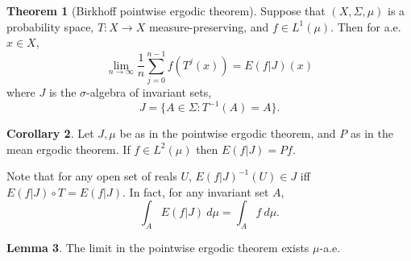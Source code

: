 \documentclass[12pt]{report}
\theoremstyle{definition}
\newtheorem{theorem}{Theorem}[chapter]
\newtheorem{lemma}[theorem]{Lemma}
\newtheorem{corollary}[theorem]{Corollary}
\begin{document}
\begin{theorem}[Birkhoff pointwise ergodic theorem]
Suppose that $(X, \Sigma, \mu)$ is a probability space, $T: X \to X$ measure-preserving, and $f \in L^1(\mu)$. Then for a.e. $x\in X$,
$$\lim_{n \to \infty} \frac{1}{n} \sum_{j=0}^{n-1} f(T^j(x)) = E(f|J)(x)$$
where $J$ is the $\sigma$-algebra of invariant sets,
$$J = \{A \in \Sigma: T^{-1}(A) = A\}.$$
\end{theorem}
\begin{corollary}
Let $J,\mu$ be as in the pointwise ergodic theorem, and $P$ as in the mean ergodic theorem. If $f \in L^2(\mu)$ then $E(f|J) = Pf$.
\end{corollary}
Note that for any open set of reals $U$, $E(f|J)^{-1}(U) \in J$ iff $E(f|J) \circ T = E(f|J)$. In fact, for any invariant set $A$,
$$\int_A E(f|J) ~d\mu = \int_A f~d\mu.$$
\begin{lemma}
The limit in the pointwise ergodic theorem exists $\mu$-a.e.
\end{lemma}
\end{document}
